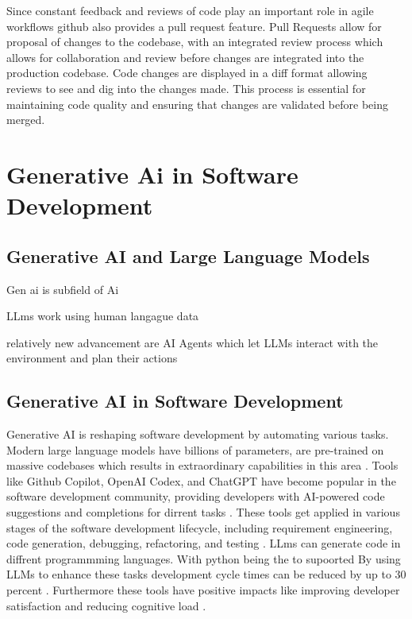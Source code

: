 Since constant feedback and reviews of code play an important role in agile workflows github also provides a pull request feature. Pull Requests allow for proposal of changes to the codebase, with an integrated review process which allows for collaboration and review before changes are integrated into the production codebase.
Code changes are displayed in a diff format allowing reviews to see and dig into the changes made.
This process is essential for maintaining code quality and ensuring that changes are validated before being merged. %

\section{Generative Ai in Software Development}

\subsection{Generative AI and Large Language Models}
Gen ai is subfield of Ai

LLms work using human langague data

relatively new advancement are AI Agents which let LLMs interact with the environment and plan their actions

\subsection{Generative AI in Software Development}
Generative AI is reshaping software development by automating various tasks. Modern large language models have billions of parameters, are pre-trained on massive codebases which results in extraordinary capabilities in this area  \cite{chenUnveilingPitfallsUnderstanding2025}.
Tools like Github Copilot, OpenAI Codex, and ChatGPT have become popular in the software development community, providing developers with AI-powered code suggestions and completions for dirrent tasks \cite{bhargavmallampatiRoleGenerativeAI2025}. These tools get applied in various stages of the software development lifecycle, including requirement engineering, code generation, debugging, refactoring, and testing \cite{houLargeLanguageModels2024, puvvadiCodingAgentsComprehensive2025,bhargavmallampatiRoleGenerativeAI2025}. LLms can generate code in diffrent programmming languages. With python being the to supoorted \cite{}
By using LLMs to enhance these tasks development cycle times can be reduced by up to 30 percent \cite{bhargavmallampatiRoleGenerativeAI2025,kalliamvakouResearchQuantifyingGitHub2022}. Furthermore these tools have positive impacts like improving developer satisfaction and reducing cognitive load \cite{kalliamvakouResearchQuantifyingGitHub2022}.

